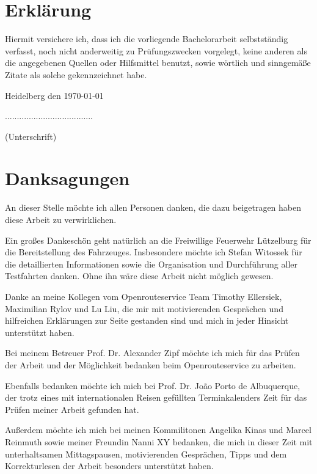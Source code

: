 \newpage
\section*{Erklärung}
\vspace{1cm}
Hiermit versichere ich, dass ich die vorliegende Bachelorarbeit selbstständig verfasst, noch nicht anderweitig zu Prüfungszwecken vorgelegt, keine anderen als die angegebenen Quellen oder Hilfsmittel benutzt, sowie wörtlich und sinngemäße Zitate als solche gekennzeichnet habe.\par
\bigskip

{\flushleft Heidelberg den \today } {\hfill .....................................\par}
{\hfill (Unterschrift)}

\newpage
\section*{Danksagungen}

An dieser Stelle möchte ich allen Personen danken, die dazu beigetragen haben diese Arbeit zu verwirklichen.\par
\vspace{0.5cm}
Ein großes Dankeschön geht natürlich an die Freiwillige Feuerwehr Lützelburg für die Bereitstellung des Fahrzeuges.
Insbesondere möchte ich Stefan Witossek für die detaillierten Informationen sowie die Organisation und Durchführung aller Testfahrten danken.
Ohne ihn wäre diese Arbeit nicht möglich gewesen.\par
\vspace{0.5cm}
Danke an meine Kollegen vom Openrouteservice Team Timothy Ellersiek, Maximilian Rylov und Lu Liu, die mir mit motivierenden Gesprächen und hilfreichen Erklärungen zur Seite gestanden sind und mich in jeder Hinsicht unterstützt haben.\par
\vspace{0.5cm}
Bei meinem Betreuer Prof. Dr. Alexander Zipf möchte ich mich für das Prüfen der Arbeit und der Möglichkeit bedanken beim Openrouteservice zu arbeiten.\par
Ebenfalls bedanken möchte ich mich bei Prof. Dr. Jo\~ao Porto de Albuquerque, der trotz eines mit internationalen Reisen gefüllten Terminkalenders Zeit für das Prüfen meiner Arbeit gefunden hat.\par
\vspace{0.5cm}
Außerdem möchte ich mich bei meinen Kommilitonen Angelika Kinas und Marcel Reinmuth sowie meiner Freundin Nanni XY bedanken, die mich in dieser Zeit mit unterhaltsamen Mittagspausen, motivierenden Gesprächen, Tipps und dem Korrekturlesen der Arbeit besonders unterstützt haben.


\newpage
\vspace{1cm}
